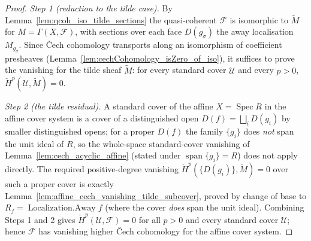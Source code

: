 \begin{proof}
  \emph{Step 1 (reduction to the tilde case).} By Lemma~\ref{lem:qcoh_iso_tilde_sections} the
  quasi-coherent \(\mathcal{F}\) is isomorphic to \(\widetilde{M}\) for
  \(M = \Gamma(X, \mathcal{F})\), with sections over each face \(D(g_\sigma)\) the away localisation
  \(M_{g_\sigma}\). Since {\v C}ech cohomology transports along an isomorphism of coefficient
  presheaves (Lemma~\ref{lem:cechCohomology_isZero_of_iso}), it suffices to prove the vanishing for
  the tilde sheaf \(\widetilde{M}\): for every standard cover \(\mathcal{U}\) and every \(p > 0\),
  \(\check{H}^p(\mathcal{U}, \widetilde{M}) = 0\).

  \emph{Step 2 (the tilde residual).} A standard cover of the affine \(X = \operatorname{Spec} R\) in
  the affine cover system is a cover of a distinguished open \(D(f) = \bigsqcup_i D(g_i)\) by smaller
  distinguished opens; for a proper \(D(f)\) the family \(\{g_i\}\) does \emph{not} span the unit
  ideal of \(R\), so the whole-space standard-cover vanishing of
  Lemma~\ref{lem:cech_acyclic_affine} (stated under \(\operatorname{span}\{g_i\} = R\)) does not
  apply directly. The required positive-degree vanishing \(\check{H}^p(\{D(g_i)\}, \widetilde{M}) = 0\)
  over such a proper cover is exactly Lemma~\ref{lem:affine_cech_vanishing_tilde_subcover}, proved by
  change of base to \(R_f = \operatorname{Localization.Away} f\) (where the cover \emph{does} span the
  unit ideal). Combining Steps 1 and 2 gives \(\check{H}^p(\mathcal{U}, \mathcal{F}) = 0\) for all
  \(p > 0\) and every standard cover \(\mathcal{U}\); hence \(\mathcal{F}\) has vanishing higher
  {\v C}ech cohomology for the affine cover system.
\end{proof}

